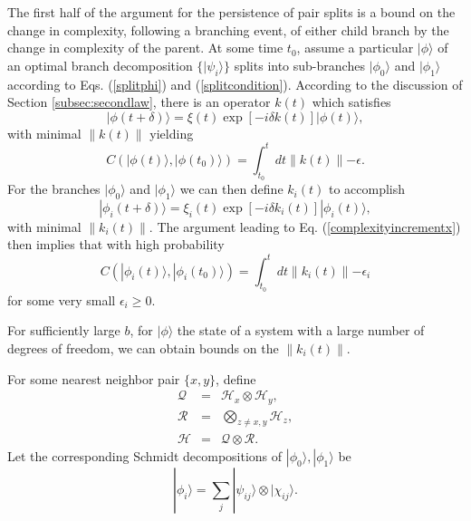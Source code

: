\documentclass[twocolumn,amsmath,amssymb]{revtex4-1}
\begin{document}
The first half of the argument for the persistence
of pair splits is a bound on the change
in complexity, following a branching event, of either child branch 
by the change in complexity of the parent.
At some time $t_0$, assume a particular $|\phi \rangle $ of an optimal branch decomposition $\{|\psi_i \rangle \}$
splits into sub-branches $|\phi_0 \rangle $ and $|\phi_1 \rangle $ according to  Eqs. (\ref{splitphi}) and (\ref{splitcondition}).
According to the discussion of Section \ref{subsec:secondlaw},
there is an operator $k(t)$ which 
satisfies
\begin{equation}
  \label{incrementalkx}
  |\phi( t + \delta) \rangle  = \xi(t) \exp[ -i \delta k(t)] |\phi(t) \rangle, 
\end{equation}
with minimal $\parallel k(t) \parallel$
yielding
\begin{equation}
  \label{complexityincrementx}
  C( |\phi(t) \rangle , |\phi(t_0) \rangle ) = \int_{t_0}^t dt \parallel k(t) \parallel - \epsilon .
\end{equation}
For the branches $|\phi_0 \rangle $ and $|\phi_1 \rangle $ we can
then define $k_i(t)$ to accomplish
\begin{equation}
  \label{incrementalki}
  |\phi_i( t + \delta) \rangle  = \xi_i(t) \exp[ -i \delta k_i(t)] |\phi_i(t) \rangle , 
\end{equation}
with minimal $\parallel k_i(t) \parallel$.
The argument leading to Eq. (\ref{complexityincrementx})
then implies that with high probability
\begin{equation}
  \label{complexityincrement3}
  C( |\phi_i(t) \rangle , |\phi_i(t_0) \rangle ) = \int_{t_0}^t dt \parallel k_i(t) \parallel - \epsilon_i
\end{equation}
for some very small $\epsilon_i \ge 0$.


For sufficiently large $b$, for $|\phi \rangle $ the state of a system
with a large number of degrees of freedom,
we can obtain bounds on the $\parallel k_i(t) \parallel$.

For some nearest neighbor pair $\{x, y\}$, define
\begin{subequations}
  \begin{eqnarray}
    \label{defQ1}
    \mathcal{Q} & = & \mathcal{H}_x \otimes \mathcal{H}_y, \\
    \label{defR}
    \mathcal{R} & = & \bigotimes_{z \ne x, y} \mathcal{H}_z, \\
    \label{defQR}
    \mathcal{H} & = & \mathcal{Q} \otimes \mathcal{R}.
  \end{eqnarray}
\end{subequations}
Let the corresponding Schmidt decompositions of $|\phi_0 \rangle , |\phi_1 \rangle $ be
\begin{equation}
  \label{defpsixhi}
  |\phi_i \rangle  = \sum_j  |\psi_{ij} \rangle  \otimes |\chi_{ij} \rangle .
\end{equation}
\end{document}

